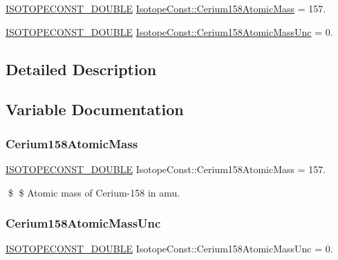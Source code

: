 \begin{DoxyCompactItemize}
\item 
\mbox{\hyperlink{group___isotope_const-_macros_ga8f45a7272ce02c0b4c65c44636ed719a}{I\+S\+O\+T\+O\+P\+E\+C\+O\+N\+S\+T\+\_\+\+D\+O\+U\+B\+LE}} \mbox{\hyperlink{group___isotope_const-_cerium-_ce158_ga89e41b100bd494c0372cd5feeba511ba}{Isotope\+Const\+::\+Cerium158\+Atomic\+Mass}} = 157.
\item 
\mbox{\hyperlink{group___isotope_const-_macros_ga8f45a7272ce02c0b4c65c44636ed719a}{I\+S\+O\+T\+O\+P\+E\+C\+O\+N\+S\+T\+\_\+\+D\+O\+U\+B\+LE}} \mbox{\hyperlink{group___isotope_const-_cerium-_ce158_gaa5687e85784127cca03654c0d4e82a6f}{Isotope\+Const\+::\+Cerium158\+Atomic\+Mass\+Unc}} = 0.
\end{DoxyCompactItemize}


\subsection{Detailed Description}


\subsection{Variable Documentation}
\mbox{\label{group___isotope_const-_cerium-_ce158_ga89e41b100bd494c0372cd5feeba511ba}} 
\subsubsection{\texorpdfstring{Cerium158\+Atomic\+Mass}{Cerium158AtomicMass}}
{\footnotesize\ttfamily \mbox{\hyperlink{group___isotope_const-_macros_ga8f45a7272ce02c0b4c65c44636ed719a}{I\+S\+O\+T\+O\+P\+E\+C\+O\+N\+S\+T\+\_\+\+D\+O\+U\+B\+LE}} Isotope\+Const\+::\+Cerium158\+Atomic\+Mass = 157.}

\$ \$ Atomic mass of Cerium-\/158 in amu. \mbox{\label{group___isotope_const-_cerium-_ce158_gaa5687e85784127cca03654c0d4e82a6f}} 
\subsubsection{\texorpdfstring{Cerium158\+Atomic\+Mass\+Unc}{Cerium158AtomicMassUnc}}
{\footnotesize\ttfamily \mbox{\hyperlink{group___isotope_const-_macros_ga8f45a7272ce02c0b4c65c44636ed719a}{I\+S\+O\+T\+O\+P\+E\+C\+O\+N\+S\+T\+\_\+\+D\+O\+U\+B\+LE}} Isotope\+Const\+::\+Cerium158\+Atomic\+Mass\+Unc = 0.}

